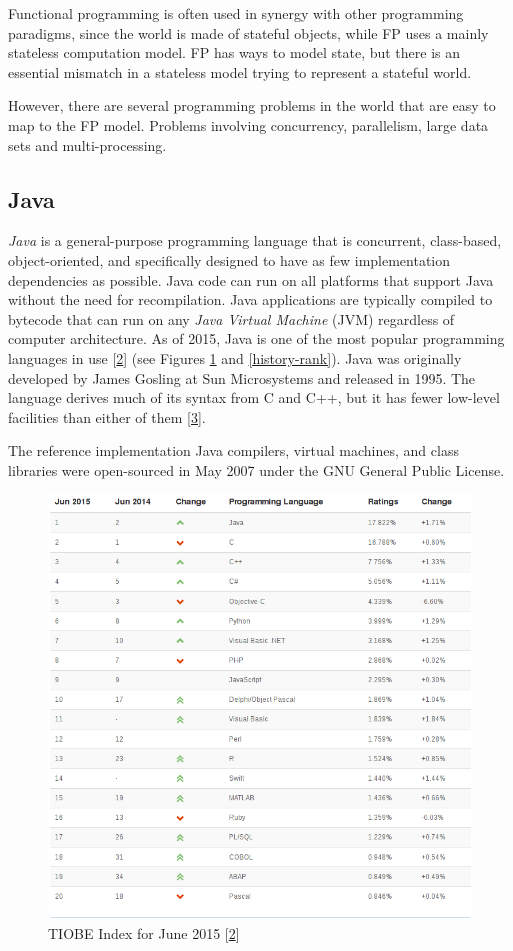 \documentclass[12pt,a4paper,oneside,openright]{book}
\begin{document}
Functional programming is often used in synergy with other programming
paradigms, since the world is made of stateful objects, while FP uses a
mainly stateless computation model. FP has ways to model state, but
there is an essential mismatch in a stateless model trying to represent
a stateful world.

However, there are several programming problems in the world that are
easy to map to the FP model. Problems involving concurrency,
parallelism, large data sets and multi-processing.

\subsection{Java}\label{java}

\emph{Java} is a general-purpose programming language that is
concurrent, class-based, object-oriented, and specifically designed to
have as few implementation dependencies as possible. Java code can run
on all platforms that support Java without the need for recompilation.
Java applications are typically compiled to bytecode that can run on any
\emph{Java Virtual Machine} (JVM) regardless of computer architecture.
As of 2015, Java is one of the most popular programming languages in use
{[}\hyperref[ref-TIOBEIndex2015]{2}{]} (see Figures \ref{lang-rank} and
\ref{history-rank}). Java was originally developed by James Gosling at
Sun Microsystems and released in 1995. The language derives much of its
syntax from C and C++, but it has fewer low-level facilities than either
of them {[}\hyperref[ref-JavaWiki2015]{3}{]}.

The reference implementation Java compilers, virtual machines, and class
libraries were open-sourced in May 2007 under the GNU General Public
License.

\begin{figure}[htbp]
\centering
\includegraphics{figures/ranking.png}
\caption{TIOBE Index for June 2015
{[}\hyperref[ref-TIOBEIndex2015]{2}{]} \label{lang-rank}}
\end{figure}
\end{document}
